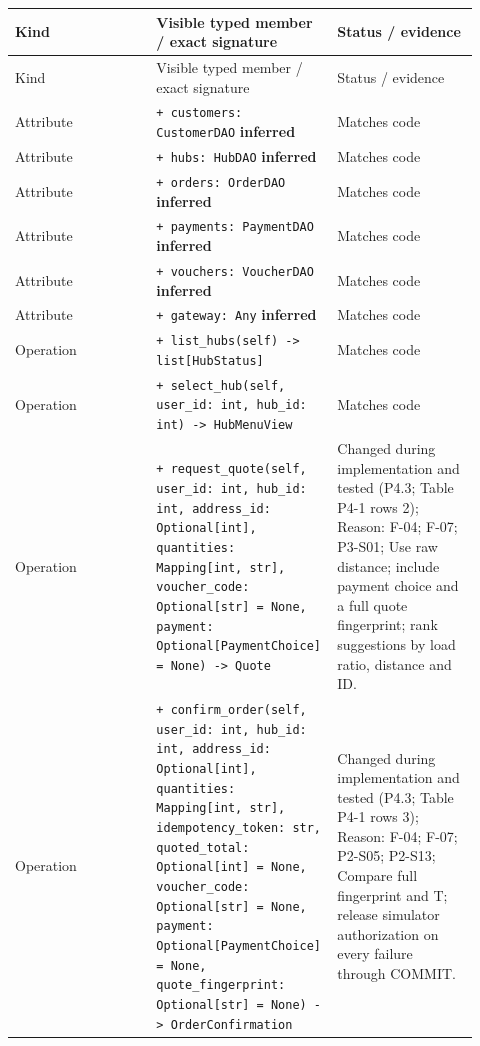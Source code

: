 \begin{longtable}{>{\raggedright\arraybackslash}p{0.3067\linewidth}>{\raggedright\arraybackslash}p{0.3067\linewidth}>{\raggedright\arraybackslash}p{0.3067\linewidth}}
Kind & Visible typed member / exact signature & Status / evidence \\
\hline\endfirsthead
Kind & Visible typed member / exact signature & Status / evidence \\
\hline\endhead
Attribute & \texttt{+ customers: CustomerDAO} \textbf{inferred} & Matches code \\
Attribute & \texttt{+ hubs: HubDAO} \textbf{inferred} & Matches code \\
Attribute & \texttt{+ orders: OrderDAO} \textbf{inferred} & Matches code \\
Attribute & \texttt{+ payments: PaymentDAO} \textbf{inferred} & Matches code \\
Attribute & \texttt{+ vouchers: VoucherDAO} \textbf{inferred} & Matches code \\
Attribute & \texttt{+ gateway: Any} \textbf{inferred} & Matches code \\
Operation & \texttt{+ list\_\allowbreak{}hubs(self) -\textgreater{} list[HubStatus]} & Matches code \\
Operation & \texttt{+ select\_\allowbreak{}hub(self, user\_\allowbreak{}id: int, hub\_\allowbreak{}id: int) -\textgreater{} HubMenuView} & Matches code \\
Operation & \texttt{+ request\_\allowbreak{}quote(self, user\_\allowbreak{}id: int, hub\_\allowbreak{}id: int, address\_\allowbreak{}id: Optional[int], quantities: Mapping[int, str], voucher\_\allowbreak{}code: Optional[str] = None, payment: Optional[PaymentChoice] = None) -\textgreater{} Quote} & Changed during implementation and tested (P4.3; Table P4-1 rows 2); Reason: F-04; F-07; P3-S01; Use raw distance; include payment choice and a full quote fingerprint; rank suggestions by load ratio, distance and ID. \\
Operation & \texttt{+ confirm\_\allowbreak{}order(self, user\_\allowbreak{}id: int, hub\_\allowbreak{}id: int, address\_\allowbreak{}id: Optional[int], quantities: Mapping[int, str], idempotency\_\allowbreak{}token: str, quoted\_\allowbreak{}total: Optional[int] = None, voucher\_\allowbreak{}code: Optional[str] = None, payment: Optional[PaymentChoice] = None, quote\_\allowbreak{}fingerprint: Optional[str] = None) -\textgreater{} OrderConfirmation} & Changed during implementation and tested (P4.3; Table P4-1 rows 3); Reason: F-04; F-07; P2-S05; P2-S13; Compare full fingerprint and T; release simulator authorization on every failure through COMMIT. \\

\end{longtable}
